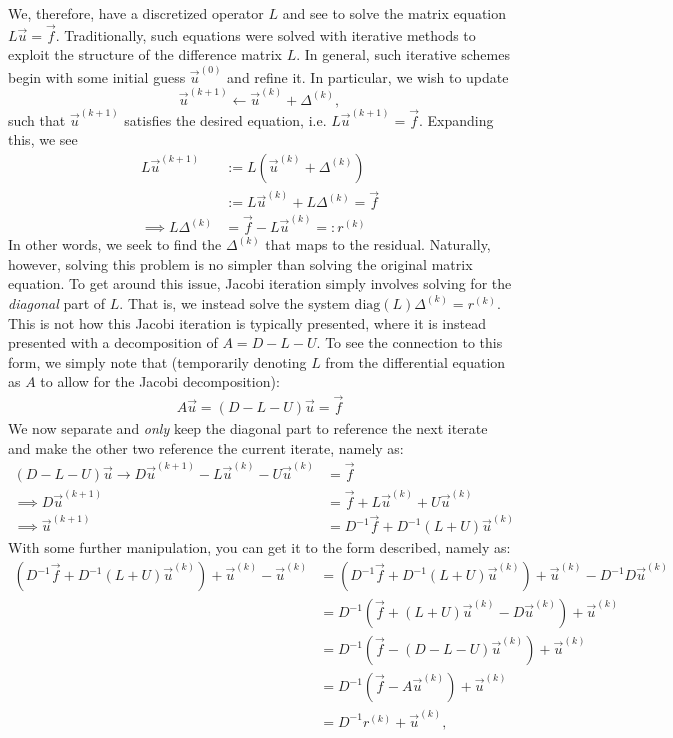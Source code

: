 \documentclass[12pt]{article}
\begin{document}
We, therefore, have a discretized operator $L$ and see to solve the matrix equation $L \vec{u} = \vec{f}$. Traditionally, such equations were solved with iterative methods to exploit the structure of the difference matrix $L$. In general, such iterative schemes begin with some initial guess $\vec{u}^{(0)}$ and refine it. In particular, we wish to update
\begin{equation}
    \vec{u}^{(k+1)}\gets\vec{u}^{(k)} + \Delta^{(k)},
\end{equation}
such that $\vec{u}^{(k+1)}$ satisfies the desired equation, i.e. $L \vec{u}^{(k+1)} = \vec{f}$. Expanding this, we see
\begin{align*}
    L \vec{u}^{(k+1)}
    &:= L (\vec{u}^{(k)} + \Delta^{(k)})\\
    &:= L \vec{u}^{(k)} + L \Delta^{(k)}
    = \vec{f} \\
    \implies
    L \Delta^{(k)} &= \vec{f} - L \vec{u}^{(k)} =: r^{(k)}
\end{align*}
In other words, we seek to find the $\Delta^{(k)}$ that maps to the residual. Naturally, however, solving this problem is no simpler than solving the original matrix equation. To get around this issue, Jacobi iteration simply involves solving for the \textit{diagonal} part of $L$. That is, we instead solve the system $\mathrm{diag}(L) \Delta^{(k)} = r^{(k)}$. This is not how this Jacobi iteration is typically presented, where it is instead presented with a decomposition of $A = D - L - U$. To see the connection to this form, we simply note that (temporarily denoting $L$ from the differential equation as $A$ to allow for the Jacobi decomposition):
\begin{align*}
    A \vec{u}
    = (D - L - U) \vec{u}
    = \vec{f}
\end{align*}
We now separate and \textit{only} keep the diagonal part to reference the next iterate and make the other two reference the current iterate, namely as:
\begin{align*}
    (D - L - U) \vec{u}
    \to
    D \vec{u}^{(k+1)} - L \vec{u}^{(k)} - U \vec{u}^{(k)}
    &= \vec{f}\\
    \implies 
    D \vec{u}^{(k+1)}
    &= \vec{f} + L \vec{u}^{(k)} + U \vec{u}^{(k)} \\
    \implies 
    \vec{u}^{(k+1)}
    &= D^{-1}\vec{f} + D^{-1} (L + U) \vec{u}^{(k)}
\end{align*}
With some further manipulation, you can get it to the form described, namely as:
\begin{align*}
    \left(D^{-1}\vec{f} + D^{-1} (L + U) \vec{u}^{(k)}\right) + \vec{u}^{(k)} - \vec{u}^{(k)}
    &= \left(D^{-1}\vec{f} + D^{-1} (L + U) \vec{u}^{(k)}\right) + \vec{u}^{(k)} - D^{-1} D \vec{u}^{(k)} \\
    &= D^{-1} \left(\vec{f} + (L + U) \vec{u}^{(k)} - D \vec{u}^{(k)} \right) + \vec{u}^{(k)}\\
    &= D^{-1} \left(\vec{f} - (D - L - U) \vec{u}^{(k)} \right) + \vec{u}^{(k)}\\
    &= D^{-1} \left(\vec{f} - A \vec{u}^{(k)} \right) + \vec{u}^{(k)}\\
    &= D^{-1} r^{(k)} + \vec{u}^{(k)},
\end{align*}
\end{document}
